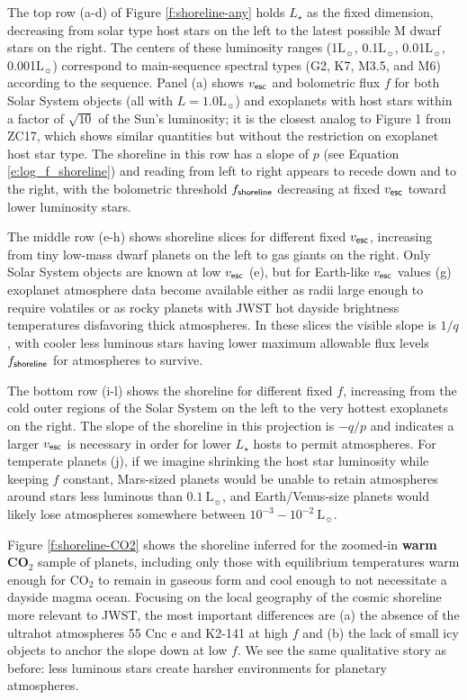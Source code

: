 \documentclass[modern,linenumbers,trackchanges]{aastex7}
\begin{document}
The top row (a-d) of Figure \ref{f:shoreline-any} holds $L_\star$ as the fixed dimension, decreasing from solar type host stars on the left to the latest possible M dwarf stars on the right. The centers of these luminosity ranges (1$\mathrm{L_\sun}$, 0.1$\mathrm{L_\sun}$, 0.01$\mathrm{L_\sun}$, 0.001$\mathrm{L_\sun}$) correspond to main-sequence spectral types (G2, K7, M3.5, and M6) according to the \citet{pecautINTRINSICCOLORSTEMPERATURES2013} sequence. Panel (a) shows $v_{\sf esc}$ and bolometric flux $f$ for both Solar System objects (all with $L = 1.0\mathrm{L_\sun}$) and exoplanets with host stars within a factor of $\sqrt{10}$ of the Sun's luminosity; it is the closest analog to Figure 1 from ZC17, which shows similar quantities but without the restriction on exoplanet host star type. The shoreline in this row has a slope of $p$ (see Equation \ref{e:log_f_shoreline}) and reading from left to right appears to recede \citep[to borrow a visual metaphor from][]{passRecedingCosmicShoreline2025} down and to the right, with the bolometric threshold $f_{\sf shoreline}$ decreasing at fixed $v_{\sf esc}$ toward lower luminosity stars. 

The middle row (e-h) shows shoreline slices for different fixed $v_{\sf esc}$, increasing from tiny low-mass dwarf planets on the left to gas giants on the right. Only Solar System objects are known at low $v_{\sf esc}$ (e), but for Earth-like $v_{\sf esc}$ values (g) exoplanet atmosphere data become available either as radii large enough to require volatiles or as rocky planets with JWST hot dayside brightness temperatures disfavoring thick atmospheres. In these slices the visible slope is $1/q$, with cooler less luminous stars having lower maximum allowable flux levels $f_{\sf shoreline}$ for atmospheres to survive. 

The bottom row (i-l) shows the shoreline for different fixed $f$, increasing from the cold outer regions of the Solar System on the left to the very hottest exoplanets on the right. The slope of the shoreline in this projection is $-q/p$ and indicates a larger $v_{\sf esc}$ is necessary in order for lower $L_\star$ hosts to permit atmospheres. For temperate planets (j), if we imagine shrinking the host star luminosity while keeping $f$ constant, Mars-sized planets would be unable to retain atmospheres around stars less luminous than $0.1~\mathrm{L_\sun}$, and Earth/Venus-size planets would likely lose atmospheres somewhere between $10^{-3} - 10^{-2}~\mathrm{L_\sun}$.

Figure \ref{f:shoreline-CO2} shows the shoreline inferred for the zoomed-in {\bf warm CO$_2$} sample of planets, including only those with equilibrium temperatures warm enough for CO$_2$ to remain in gaseous form and cool enough to not necessitate a dayside magma ocean. Focusing on the local geography of the cosmic shoreline more relevant to JWST, the most important differences are (a) the absence of the ultrahot atmospheres 55 Cnc e and K2-141 at high $f$ and (b) the lack of small icy objects to anchor the slope down at low $f$. We see the same qualitative story as before: less luminous stars create harsher environments for planetary atmospheres. 
\end{document}
